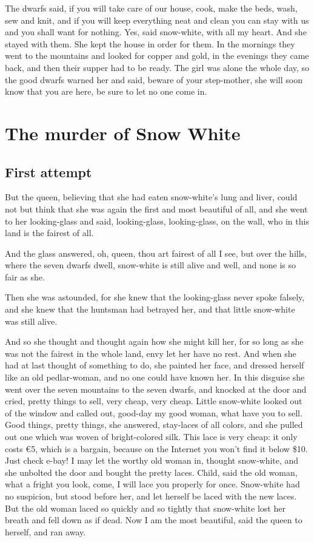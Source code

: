 \documentclass[a4paper,11pt]{article}
\begin{document}
The dwarfs said, if you will take care of our house, cook, make
the beds, wash, sew and knit, and if you will keep everything neat
and clean you can stay with us and you shall want for nothing.
Yes, said snow-white, with all my heart.  And she stayed with
them.  She kept the house in order for them.  In the mornings
they went to the mountains and looked for copper and gold, in the
evenings they came back, and then their supper had to be ready.
The girl was alone the whole day, so the good dwarfs warned her
and said, beware of your step-mother, she will soon know that you
are here, be sure to let no one come in.


\section{The murder of Snow White}
\subsection{First attempt}

But the queen, believing that she had eaten snow-white's lung and
liver, could not but think that she was again the first and most
beautiful of all, and she went to her looking-glass and said,
looking-glass, looking-glass, on the wall,
          who in this land is the fairest of all.

And the glass answered,
          oh, queen, thou art fairest of all I see,
          but over the hills, where the seven dwarfs dwell,
          snow-white is still alive and well,
          and none is so fair as she.

Then she was astounded, for she knew that the looking-glass
never spoke falsely, and she knew that the huntsman had betrayed
her, and that little snow-white was still alive.

And so she thought and thought again how she might kill her,
for so long as she was not the fairest in the whole land, envy let
her have no rest.  And when she had at last thought of something
to do, she painted her face, and dressed herself like an old
pedlar-woman, and no one could have known her.  In this disguise
she went over the seven mountains to the seven dwarfs, and
knocked at the door and cried, pretty things to sell, very cheap,
very cheap.  Little snow-white looked out of the window and called
out, good-day my good woman, what have you to sell.  Good things,
pretty things, she answered, stay-laces of all colors, and she
pulled out one which was woven of bright-colored silk.  This lace
is very cheap: it only costs \euro 5, which is a bargain, because on the
Internet you won't find it below \$10. Just check e-bay! I may let
the worthy old woman in, thought snow-white, and she unbolted the
door and bought the pretty laces.  Child, said the old woman,
what a fright you look, come, I will lace you properly for once.
Snow-white had no suspicion, but stood before her, and let herself
be laced with the new laces.  But the old woman laced so quickly
and so tightly that snow-white lost her breath and fell down as
if dead.  Now I am the most beautiful, said the queen to herself,
and ran away.
\end{document}
